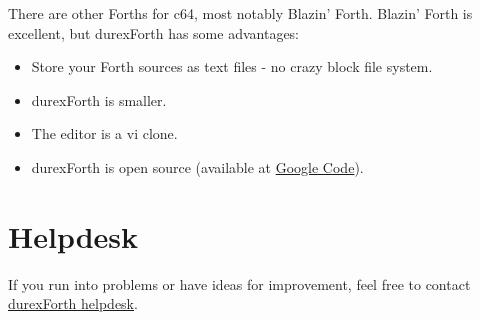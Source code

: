 There are other Forths for c64, most notably Blazin' Forth. Blazin' Forth is excellent, but durexForth has some advantages:

\begin{itemize}
\item Store your Forth sources as text files - no crazy block file system.
\item durexForth is smaller.
\item The editor is a vi clone.
\item durexForth is open source (available at \href{http://code.google.com/p/durexforth/}{Google Code}).
\end{itemize}

\section{Helpdesk}

If you run into problems or have ideas for improvement, feel free to contact \href{mailto:kotlinski@gmail.com}{durexForth helpdesk}.
